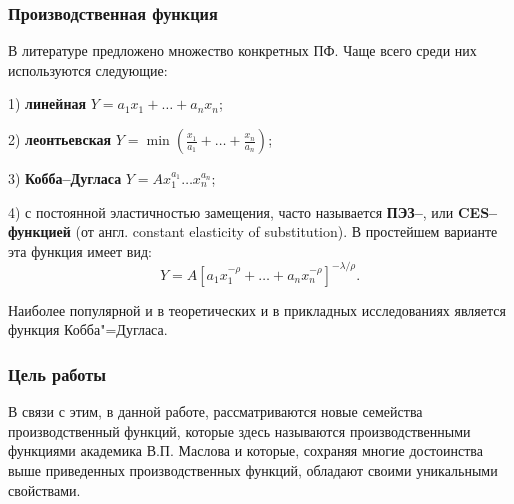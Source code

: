 \documentclass[10pt, pdf, hyperref={unicode}]{beamer}
\begin{document}
    \begin{frame}
        \frametitle{Производственная функция}
        \begin{center}
            \begin{minipage}[h]{0.97\linewidth}
                В литературе предложено множество конкретных ПФ. Чаще всего среди
                них используются следующие:

                1) {\bf линейная} $Y=a_1x_1+\dots+a_nx_n$;

                2) {\bf леонтьевская}
                $Y=\min\left(\frac{x_1}{a_1}+\dots+\frac{x_n}{a_n}\right)$;

                3) {\bf Кобба--Дугласа} $Y=Ax_1^{a_1}\dots x_n^{a_n}$;

                4) с постоянной эластичностью замещения, часто называется {\bf
                ПЭЗ--}, или {\bf CES-- функцией} (от англ. constant elasticity of
                substitution). В простейшем варианте эта функция имеет вид:
                $$Y=A[a_1x_1^{-\rho}+\dots+a_nx_n^{-\rho}]^{-\lambda/\rho}.$$

                Наиболее популярной и в теоретических и в прикладных исследованиях
                является функция Кобба"=Дугласа.
            \end{minipage}
        \end{center}
    \end{frame}

    \begin{frame}
        \frametitle{Цель работы}
        \begin{center}
            \begin{minipage}[h]{0.97\linewidth}
                В связи с этим, в данной работе, рассматриваются новые семейства производственный функций,
                которые здесь называются производственными функциями академика В.П. Маслова и которые,
                сохраняя многие достоинства выше приведенных производственных функций, обладают своими уникальными свойствами.
            \end{minipage}
        \end{center}
    \end{frame}
\end{document}

